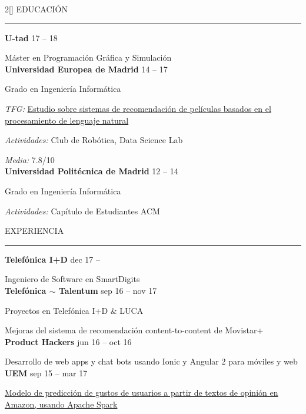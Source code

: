 \documentclass[a4paper, 12pt]{article}
\newenvironment{myparacol}[2][]{%
\begin{paracol}{#2}[#1]\setlength{\parindent}{0pt}}{%
\end{paracol}}
\begin{document}
\setlength{\columnsep}{24pt}
\begin{myparacol}{2}
    EDUCACIÓN
    \vspace{1mm}
    \hrule
    \kern9pt
    \textbf{U-tad} \hfill 17 -- 18

    Máster en Programación Gráfica y Simulación\\

    \textbf{Universidad Europea de Madrid} \hfill 14 -- 17

    Grado en Ingeniería Informática

    \textit{TFG:} \href{https://github.com/hugo19941994/movie-pepper-doc/raw/master/thesis.pdf}{Estudio sobre sistemas de recomendación de películas basados en el procesamiento de lenguaje natural}

    \textit{Actividades:} Club de Robótica, Data Science Lab

    \textit{Media:} 7.8/10\\

    \textbf{Universidad Politécnica de Madrid} \hfill 12 -- 14

    Grado en Ingeniería Informática

    \textit{Actividades:} Capítulo de Estudiantes ACM
    \\

    \switchcolumn

    EXPERIENCIA
    \vspace{1mm}
    \hrule
    \kern9pt

    \textbf{Telefónica I+D} \hfill dec 17 --

    Ingeniero de Software en SmartDigits\\

    \textbf{Telefónica $\sim$ Talentum} \hfill sep 16 -- nov 17

    Proyectos en Telefónica I+D \& LUCA

    Mejoras del sistema de recomendación content-to-content de Movistar+\\

    \textbf{Product Hackers} \hfill jun 16 -- oct 16

    Desarrollo de web apps y chat bots usando Ionic y Angular 2 para móviles y web\\

    \textbf{UEM} \hfill sep 15 -- mar 17

    \href{https://www.researchgate.net/publication/314142014_Prediction_of_User_Opinion_for_Products_-_A_Bag-of-Words_and_Collaborative_Filtering_based_Approach}{Modelo de predicción de gustos de usuarios a partir de textos de opinión en Amazon, usando Apache Spark}


\end{myparacol}
\end{document}
